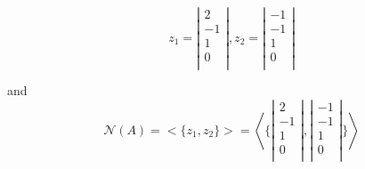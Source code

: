 \documentclass{article}
\begin{document}
\begin{equation}
  z_1 =
  \left| \begin{array}{ccccc}
    2 \\
    -1 \\
    1 \\
    0 \\
  \end{array} \right|
  ,
  z_2 =
  \left| \begin{array}{ccccc}
    -1 \\
    -1 \\
    1 \\
    0 \\
  \end{array} \right|
\end{equation}

and
\begin{equation}
  \mathcal{N}(A) = <\{z_1,z_2\}>=
  \left< \{ \left| \begin{array}{ccccc}
    2 \\
    -1 \\
    1 \\
    0 \\
  \end{array} \right|
  ,
  \left| \begin{array}{ccccc}
    -1 \\
    -1 \\
    1 \\
    0 \\
  \end{array} \right| \} \right>
\end{equation}
\end{document}
